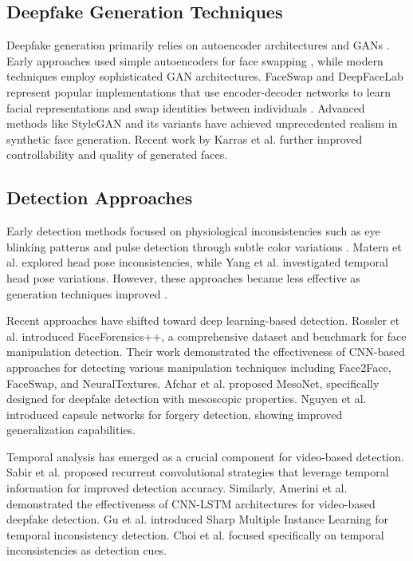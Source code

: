 \documentclass[conference]{IEEEtran}
\begin{document}
\subsection{Deepfake Generation Techniques}
Deepfake generation primarily relies on autoencoder architectures and GANs \cite{goodfellow2014generative}. Early approaches used simple autoencoders for face swapping \cite{korshunova2017fast}, while modern techniques employ sophisticated GAN architectures. FaceSwap and DeepFaceLab represent popular implementations that use encoder-decoder networks to learn facial representations and swap identities between individuals \cite{li2020celeb}. Advanced methods like StyleGAN \cite{karras2019style} and its variants have achieved unprecedented realism in synthetic face generation. Recent work by Karras et al. \cite{karras2020analyzing} further improved controllability and quality of generated faces.

\subsection{Detection Approaches}
Early detection methods focused on physiological inconsistencies such as eye blinking patterns \cite{li2018ictu} and pulse detection through subtle color variations \cite{li2019dfdnet}. Matern et al. \cite{matern2019exploiting} explored head pose inconsistencies, while Yang et al. \cite{yang2019exposing} investigated temporal head pose variations. However, these approaches became less effective as generation techniques improved \cite{li2020eyes}.

Recent approaches have shifted toward deep learning-based detection. Rossler et al. \cite{rossler2019faceforensics} introduced FaceForensics++, a comprehensive dataset and benchmark for face manipulation detection. Their work demonstrated the effectiveness of CNN-based approaches for detecting various manipulation techniques including Face2Face, FaceSwap, and NeuralTextures. Afchar et al. \cite{afchar2018mesonet} proposed MesoNet, specifically designed for deepfake detection with mesoscopic properties. Nguyen et al. \cite{nguyen2019capsule} introduced capsule networks for forgery detection, showing improved generalization capabilities.

Temporal analysis has emerged as a crucial component for video-based detection. Sabir et al. \cite{sabir2019recurrent} proposed recurrent convolutional strategies that leverage temporal information for improved detection accuracy. Similarly, Amerini et al. \cite{amerini2019deepfake} demonstrated the effectiveness of CNN-LSTM architectures for video-based deepfake detection. Gu et al. \cite{gu2020sharp} introduced Sharp Multiple Instance Learning for temporal inconsistency detection. Choi et al. \cite{choi2020temporal} focused specifically on temporal inconsistencies as detection cues.
\end{document}
